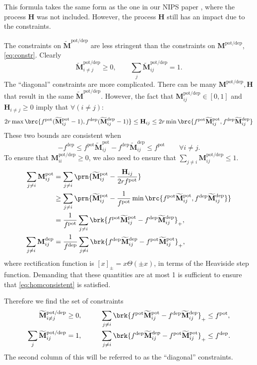 \documentclass[12pt]{article}
\newcommand{\M}{\mathbf{M}}
\newcommand{\pot}{^{\text{pot}}}
\newcommand{\dep}{^{\text{dep}}}
\newcommand{\potdep}{^{\text{pot/dep}}}
\renewcommand{\hom}{\mathbf{H}}
\newcommand{\Mh}{\widetilde{\M}}
\begin{document}
This formula takes the same form as the one in our NIPS paper \cite{Lahiri2013synapse}, where the process $\hom$ was not included.
However, the process $\hom$ still has an impact due to the constraints.

The constraints on $\Mh\potdep$ are less stringent than the constraints on $\M\potdep$, \eqref{eq:constr}.
Clearly
%
\begin{equation}\label{eq:constrhoffdiag}
  \Mh\potdep_{i \neq j} \geq 0, \qquad
  \sum_j \Mh\potdep_{ij} = 1.
\end{equation}
%
The ``diagonal'' constraints are more complicated.
There can be many $\M\potdep,\hom$ that result in the same $\Mh\potdep$.
However, the fact that $\M\potdep_{ij} \in [0,1]$ and $\hom_{i\neq j} \geq 0$ imply that $\forall (i \neq j)$:
%
\begin{equation}\label{eq:homrange}
  2r\max\brc{f\pot(\Mh\pot_{ij}-1),f\dep(\Mh\dep_{ij}-1)} \leq \hom_{ij} \leq 2r\min\brc{f\pot\Mh\pot_{ij},f\dep\Mh\dep_{ij}}
\end{equation}
%
These two bounds are consistent when
%
\begin{equation}\label{eq:homconsistent}
  -f\dep \leq f\pot\Mh\pot_{ij} - f\dep\Mh\dep_{ij} \leq f\pot
  \qquad \forall i\neq j.
\end{equation}
%
To ensure that $\M\potdep_{ii} \geq 0$, we also need to ensure that $\sum_{j\neq i}\M\potdep_{ij} \leq 1$.
%
\begin{equation}\label{eq:homdiag}
\begin{aligned}
  \sum_{j\neq i} \M\pot_{ij}
    &= \sum_{j\neq i} \prn{ \Mh\pot_{ij} - \frac{\hom_{ij}}{2rf\pot} }\\
    &\geq \sum_{j\neq i} \prn{ \Mh\pot_{ij} - \frac{1}{f\pot}  \min\brc{ f\pot\Mh\pot_{ij},f\dep\Mh\dep_{ij} } }\\
    &= \frac{1}{f\pot} \sum_{j\neq i} \brk{ f\pot\Mh\pot_{ij}-f\dep\Mh\dep_{ij} }_+ , \\
  \sum _{j\neq i} \M\dep_{ij}
    &= \frac{1}{f\dep} \sum_{j\neq i} \brk{ f\dep\Mh\dep_{ij}-f\pot\Mh\pot_{ij} }_+ ,
\end{aligned}
\end{equation}
%
where rectification function is $[x]_\pm = x \Theta(\pm x)$, in terms of the Heaviside step function.
Demanding that these quantities are at most 1 is sufficient to ensure that \eqref{eq:homconsistent} is satisfied.

Therefore we find the set of constraints
%
\begin{equation}\label{eq:constrh}
\begin{aligned}
  \Mh\potdep_{i \neq j} &\geq 0, &\qquad
  \sum_{j\neq i} \brk{ f\pot\Mh\pot_{ij}-f\dep\Mh\dep_{ij} }_+ &\leq f\pot, \\
  \sum_j \Mh\potdep_{ij} &=1, &
  \sum_{j\neq i} \brk{ f\dep\Mh\dep_{ij}-f\pot\Mh\pot_{ij} }_+  &\leq f\dep.
\end{aligned}
\end{equation}
%
The second column of this will be referred to as the ``diagonal'' constraints.
\end{document}
